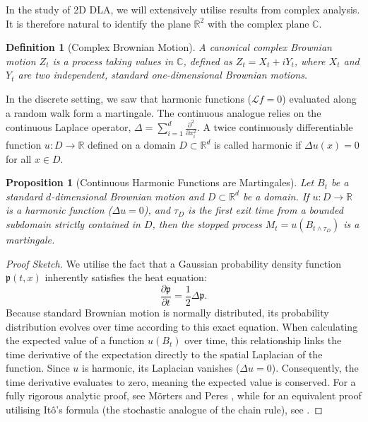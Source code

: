 \documentclass[12pt, a4paper, oneside]{report}
\newtheorem{definition}[theorem]{Definition}
\newtheorem{proposition}[theorem]{Proposition}
\theoremstyle{remark}
\begin{document}
In the study of 2D DLA, we will extensively utilise results from complex analysis. It is therefore natural to identify the plane $\mathbb{R}^2$ with the complex plane $\mathbb{C}$.

\begin{definition}[Complex Brownian Motion]
A canonical complex Brownian motion $Z_t$ is a process taking values in $\mathbb{C}$, defined as $Z_t = X_t + iY_t$, where $X_t$ and $Y_t$ are two independent, standard one-dimensional Brownian motions.
\end{definition}

In the discrete setting, we saw that harmonic functions ($\mathcal{L}f = 0$) evaluated along a random walk form a martingale. The continuous analogue relies on the continuous Laplace operator, $\Delta = \sum_{i=1}^d \frac{\partial^2}{\partial x_i^2}$. A twice continuously differentiable function $u: D \to \mathbb{R}$ defined on a domain $D \subset \mathbb{R}^d$ is called harmonic if $\Delta u(x) = 0$ for all $x \in D$.

\begin{proposition}[Continuous Harmonic Functions are Martingales]
\label{prop:continuous_martingale}
Let $B_t$ be a standard $d$-dimensional Brownian motion and $D \subset \mathbb{R}^d$ be a domain. If $u: D \to \mathbb{R}$ is a harmonic function ($\Delta u = 0$), and $\tau_D$ is the first exit time from a bounded subdomain strictly contained in $D$, then the stopped process $M_t = u(B_{t \wedge \tau_D})$ is a martingale.
\end{proposition}

\begin{proof}[Proof Sketch]
We utilise the fact that a Gaussian probability density function $\mathfrak{p}(t, x)$ inherently satisfies the heat equation:
\begin{equation*}
    \frac{\partial \mathfrak{p}}{\partial t} = \frac{1}{2}\Delta \mathfrak{p}.
\end{equation*}
Because standard Brownian motion is normally distributed, its probability distribution evolves over time according to this exact equation. When calculating the expected value of a function $u(B_t)$ over time, this relationship links the time derivative of the expectation directly to the spatial Laplacian of the function. Since $u$ is harmonic, its Laplacian vanishes ($\Delta u = 0$). Consequently, the time derivative evaluates to zero, meaning the expected value is conserved.
For a fully rigorous analytic proof, see M{\"o}rters and Peres \cite[Theorem 2.51 and Corollary 2.53]{Morters2010}, while for an equivalent proof utilising Itô's formula (the stochastic analogue of the chain rule), see \cite[Theorem 7.18]{Morters2010}.
\end{proof}
\end{document}
